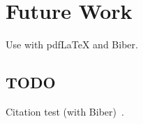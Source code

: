 
\chapter{Future Work}\label{chapter:future_work}
Use with pdfLaTeX and Biber.

\section{TODO}
Citation test (with Biber)~\parencite{latex}.

